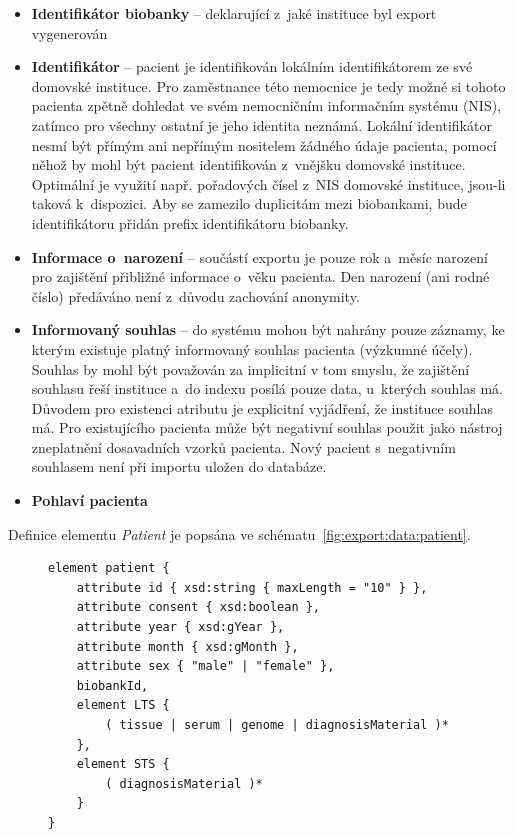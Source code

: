 \documentclass[11pt,draft,oneside]{fithesis2}
\newcommand{\polozka}[1]{\item {\bf #1}\xspace}
\begin{document}
\begin{itemize}
		\polozka{Identifikátor biobanky} -- deklarující z~jaké instituce byl export vygenerován

		\polozka{Identifikátor} -- pacient je identifikován lokálním identifikátorem ze své domovské instituce. Pro zaměstnance této nemocnice je tedy možné si tohoto pacienta zpětně dohledat ve svém nemocničním informačním systému (NIS), zatímco pro všechny ostatní je jeho identita neznámá. Lokální identifikátor nesmí být přímým ani nepřímým nositelem žádného údaje pacienta, pomocí něhož by mohl být pacient identifikován z~vnějšku domovské instituce. Optimální je využití např. pořadových čísel z~NIS domovské instituce, jsou-li taková k~dispozici. Aby se zamezilo duplicitám mezi biobankami, bude identifikátoru přidán prefix identifikátoru biobanky.
		
		\polozka{Informace o~narození} -- součástí exportu je pouze rok a~měsíc narození pro zajištění přibližné informace o~věku pacienta. Den narození (ani rodné číslo) předáváno není z~důvodu zachování anonymity.
		
		\polozka{Informovaný souhlas} -- do systému mohou být nahrány pouze záznamy, ke kterým existuje platný informovaný souhlas pacienta (výzkumné účely). Souhlas by mohl být považován za implicitní v tom smyslu, že zajištění souhlasu řeší instituce a~do indexu posílá pouze data, u~kterých souhlas má. Důvodem pro existenci atributu je explicitní vyjádření, že instituce souhlas má. Pro existujícího pacienta může být negativní souhlas použit jako nástroj zneplatnění dosavadních vzorků pacienta. Nový pacient s~negativním souhlasem není při importu uložen do databáze. 
			
		\polozka{Pohlaví pacienta}
		
	\end{itemize}
Definice elementu \textit{Patient} je popsána ve schématu~\ref{fig:export:data:patient}.

\begin{figure}[h!]
\begin{center}
\begin{lstlisting}[language=XML, caption={Element popisující pacienta v~exportním schématu.}, label={fig:export:data:patient}]
element patient {		
	attribute id { xsd:string { maxLength = "10" } },		
	attribute consent { xsd:boolean },   
	attribute year { xsd:gYear },	  
	attribute month { xsd:gMonth },   
	attribute sex { "male" | "female" },	  
	biobankId,		
	element LTS {
		( tissue | serum | genome | diagnosisMaterial )*
	},		
	element STS {
		( diagnosisMaterial )*
	}
}

\end{lstlisting}
\end{center}
\end{figure}
\end{document}

